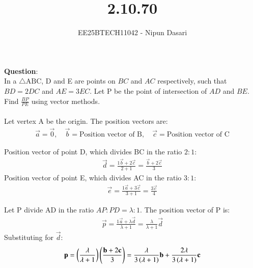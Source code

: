\documentclass[journal]{IEEEtran}
\begin{document}
	
	
	\vspace{3cm}
	
	\title{2.10.70}
	\author{EE25BTECH11042 - Nipun Dasari}
	\maketitle
	
	\renewcommand{\thefigure}{\theenumi}
	\renewcommand{\thetable}{\theenumi}
	\setlength{\intextsep}{10pt} %
	
	
	\renewcommand{\thetable}{\theenumi}
	
	\textbf{Question}:\\
	In a $\triangle \text{ABC}$, D and E are points on $BC$ and $AC$ respectively, such that $BD = 2DC$ and $AE = 3EC$. Let P be the point of intersection of $AD$ and $BE$. Find $\frac{BP}{PE}$ using vector methods. \\ 
	\solution \\
	
	Let vertex A be the origin. The position vectors are:
	\begin{align}
		\vec{a} = \vec{0}, \quad \vec{b} = \text{Position vector of B}, \quad \vec{c} = \text{Position vector of C}
	\end{align}
	
	Position vector of point D, which divides BC in the ratio $2:1$:
	\begin{align}
		\vec{d} = \frac{1\vec{b} + 2\vec{c}}{2+1} = \frac{\vec{b} + 2\vec{c}}{3}
	\end{align}
	Position vector of point E, which divides AC in the ratio $3:1$:
	\begin{align}
		\vec{e} = \frac{1\vec{a} + 3\vec{c}}{3+1} = \frac{3\vec{c}}{4}
	\end{align}
	
	Let P divide AD in the ratio $AP:PD = \lambda:1$. The position vector of P is:
	\begin{align}
		\vec{p} = \frac{1\vec{a} + \lambda\vec{d}}{\lambda+1} = \frac{\lambda}{\lambda+1} \vec{d}
	\end{align}
	Substituting for $\vec{d}$:
	\begin{align}
		\mathbf{p} = \left( \frac{\lambda}{\lambda+1} \right) \left( \frac{\mathbf{b} + 2\mathbf{c}}{3} \right) = \frac{\lambda}{3\left(\lambda+1\right)}\mathbf{b} + \frac{2\lambda}{3\left(\lambda+1\right)}\mathbf{c} \label{eq:1}
	\end{align}
	
\end{document}
